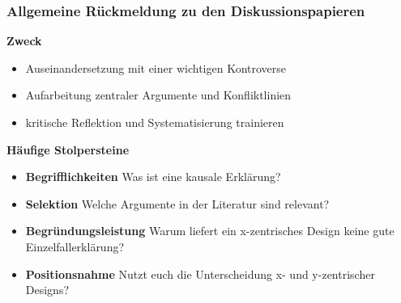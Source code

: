 \documentclass{beamer}
\begin{document}
\begin{frame}
\frametitle{Allgemeine Rückmeldung zu den Diskussionspapieren}
\textbf{Zweck}
\begin{itemize}
  \item Auseinandersetzung mit einer wichtigen Kontroverse
  \item Aufarbeitung zentraler Argumente und Konfliktlinien
  \item kritische Reflektion und Systematisierung trainieren
\end{itemize}

\textbf{Häufige Stolpersteine}
\begin{itemize}
  \item \textbf{Begrifflichkeiten} Was ist eine kausale Erklärung?
  \item \textbf{Selektion} Welche Argumente in der Literatur sind relevant?
  \item \textbf{Begründungsleistung} Warum liefert ein x-zentrisches Design keine gute Einzelfallerklärung?
  \item \textbf{Positionsnahme} Nutzt euch die Unterscheidung x- und y-zentrischer Designs?
\end{itemize}
\end{frame}
\end{document}
